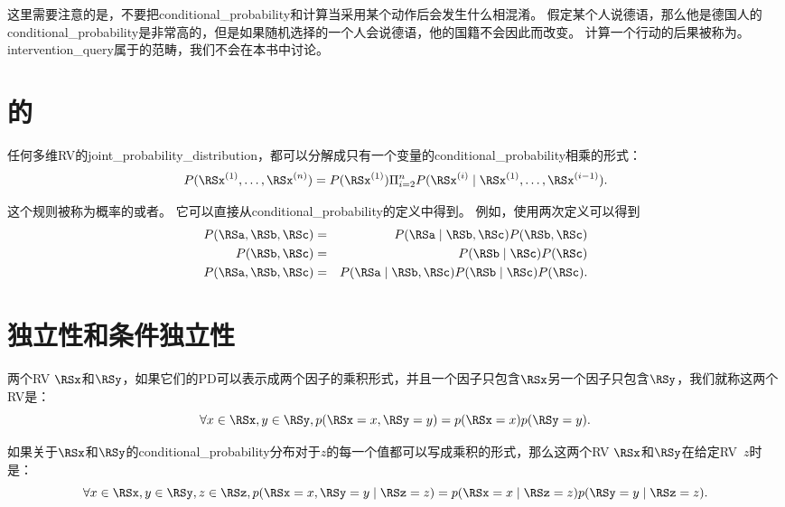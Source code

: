 这里需要注意的是，不要把\gls{conditional_probability}和计算当采用某个动作后会发生什么相混淆。
假定某个人说德语，那么他是德国人的\gls{conditional_probability}是非常高的，但是如果随机选择的一个人会说德语，他的国籍不会因此而改变。
计算一个行动的后果被称为。
\gls{intervention_query}属于的范畴，我们不会在本书中讨论。

\section{的}
\label{sec:the_chain_rule_of_conditional_probabilities}

任何多维\gls{RV}的\gls{joint_probability_distribution}，都可以分解成只有一个变量的\gls{conditional_probability}相乘的形式：
\begin{equation}
P(\RSx^{(1)}, \ldots, \RSx^{(n)}) = P(\RSx^{(1)}) \Pi_{i=2}^n P(\RSx^{(i)} \mid \RSx^{(1)}, \ldots, \RSx^{(i-1)}) .
\label{eq:chap3_chain_rule}
\end{equation}


这个规则被称为概率的或者。
它可以直接从\gls{conditional_probability}的定义中得到。
例如，使用两次定义可以得到
\begin{eqnarray*}
P(\RSa, \RSb, \RSc) &=& P(\RSa \mid \RSb, \RSc) P(\RSb, \RSc)\\
P(\RSb, \RSc) &=& P(\RSb \mid \RSc) P(\RSc)\\
P(\RSa, \RSb, \RSc) &=& P(\RSa \mid \RSb, \RSc) P(\RSb \mid \RSc) P(\RSc).
\end{eqnarray*}

\section{独立性和条件独立性}
\label{sec:independence_and_conditional_independence}

两个\gls{RV} $\RSx$和$\RSy$，如果它们的\gls{PD}可以表示成两个因子的乘积形式，并且一个因子只包含$\RSx$另一个因子只包含$\RSy$，我们就称这两个\gls{RV}是：
\begin{equation}
\forall x \in \RSx, y \in \RSy, p(\RSx = x, \RSy = y) = p(\RSx = x)p(\RSy = y).
\end{equation}

如果关于$\RSx$和$\RSy$的\gls{conditional_probability}分布对于$z$的每一个值都可以写成乘积的形式，那么这两个\gls{RV} $\RSx$和$\RSy$在给定\gls{RV}~$z$时是：
\begin{equation}
\forall x \in \RSx, y \in \RSy, z \in \RSz, p( \RSx=x, \RSy=y \mid \RSz=z) =
p(\RSx = x \mid \RSz = z) p(\RSy = y \mid \RSz = z).
\end{equation}

